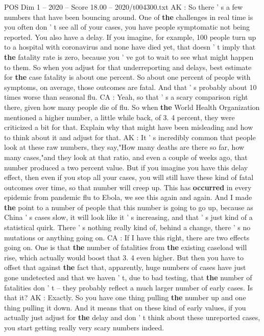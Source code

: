 \begin{textsample}{POS Dim 1 – 2020 – Score 18.00 – 2020/t004300.txt}
AK : So there ' s a few numbers that have been bouncing around.
One of \textbf{the} challenges in real time is you often don ' t see all of your cases, you have people symptomatic not being reported.
You also have a delay.
If you imagine, for example, 100 people turn up to a hospital with coronavirus and none have died yet, that doesn ' t imply that \textbf{the} fatality rate is zero, because you ' ve got to wait to see what might happen to them.
So when you adjust for that underreporting and delays, best estimate for \textbf{the} case fatality is about one percent.
So about one percent of people with symptoms, on average, those outcomes are fatal.
And that ' s probably about 10 times worse than seasonal flu.
CA : Yeah, so that ' s a scary comparison right there, given how many people die of flu.
So when \textbf{the} World Health Organization mentioned a higher number, a little while back, of 3. 4 percent, they were criticized a bit for that.
Explain why that might have been misleading and how to think about it and adjust for that.
AK : It ' s incredibly common that people look at these raw numbers, they say,"How many deaths are there so far, how many cases,"and they look at that ratio, and even a couple of weeks ago, that number produced a two percent value.
But if you imagine you have this delay effect, then even if you stop all your cases, you will still have these kind of fatal outcomes over time, so that number will creep up.
This has \textbf{occurred} in every epidemic from pandemic flu to Ebola, we see this again and again.
And I made \textbf{the} point to a number of people that this number is going to go up, because as China ' s cases slow, it will look like it ' s increasing, and that ' s just kind of a statistical quirk.
There ' s nothing really kind of, behind a change, there ' s no mutations or anything going on.
CA : If I have this right, there are two effects going on.
One is that \textbf{the} number of fatalities from \textbf{the} existing caseload will rise, which actually would boost that 3. 4 even higher.
But then you have to offset that against \textbf{the} fact that, apparently, huge numbers of cases have just gone undetected and that we haven ' t, due to bad testing, that \textbf{the} number of fatalities don ' t -- they probably reflect a much larger number of early cases.
Is that it?
AK : Exactly.
So you have one thing pulling \textbf{the} number up and one thing pulling it down.
And it means that on these kind of early values, if you actually just adjust for \textbf{the} delay and don ' t think about these unreported cases, you start getting really very scary numbers indeed.

\end{textsample}
